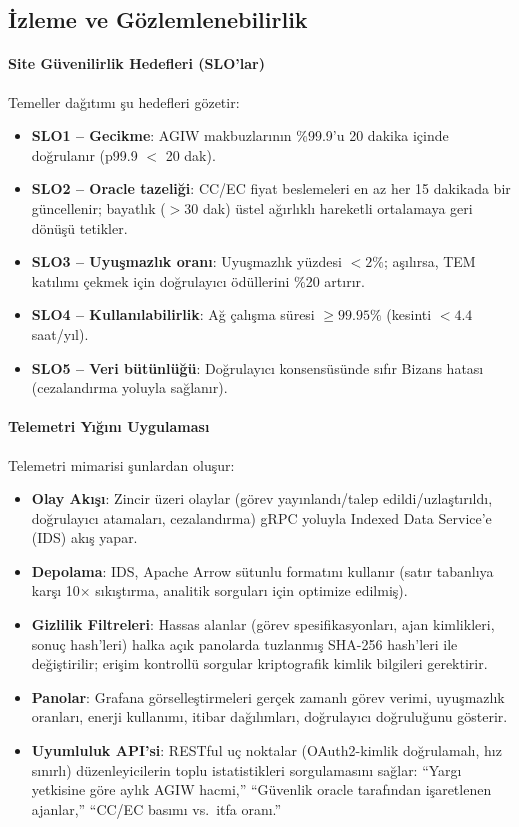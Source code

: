 \documentclass[11pt]{article}
\begin{document}
\subsection{İzleme ve Gözlemlenebilirlik}
\paragraph{Site Güvenilirlik Hedefleri (SLO'lar)} Temeller dağıtımı şu hedefleri gözetir:
\begin{itemize}[noitemsep]
  \item \textbf{SLO1 -- Gecikme}: AGIW makbuzlarının \%99.9'u 20 dakika içinde doğrulanır (p99.9 $<$ 20 dak).
  \item \textbf{SLO2 -- Oracle tazeliği}: CC/EC fiyat beslemeleri en az her 15 dakikada bir güncellenir; bayatlık ($>30$ dak) üstel ağırlıklı hareketli ortalamaya geri dönüşü tetikler.
  \item \textbf{SLO3 -- Uyuşmazlık oranı}: Uyuşmazlık yüzdesi $<2\%$; aşılırsa, TEM katılımı çekmek için doğrulayıcı ödüllerini \%20 artırır.
  \item \textbf{SLO4 -- Kullanılabilirlik}: Ağ çalışma süresi $\geq 99.95\%$ (kesinti $<4.4$ saat/yıl).
  \item \textbf{SLO5 -- Veri bütünlüğü}: Doğrulayıcı konsensüsünde sıfır Bizans hatası (cezalandırma yoluyla sağlanır).
\end{itemize}

\paragraph{Telemetri Yığını Uygulaması} Telemetri mimarisi şunlardan oluşur:
\begin{itemize}[noitemsep]
  \item \textbf{Olay Akışı}: Zincir üzeri olaylar (görev yayınlandı/talep edildi/uzlaştırıldı, doğrulayıcı atamaları, cezalandırma) gRPC yoluyla Indexed Data Service'e (IDS) akış yapar.
  \item \textbf{Depolama}: IDS, Apache Arrow sütunlu formatını kullanır (satır tabanlıya karşı 10$\times$ sıkıştırma, analitik sorguları için optimize edilmiş).
  \item \textbf{Gizlilik Filtreleri}: Hassas alanlar (görev spesifikasyonları, ajan kimlikleri, sonuç hash'leri) halka açık panolarda tuzlanmış SHA-256 hash'leri ile değiştirilir; erişim kontrollü sorgular kriptografik kimlik bilgileri gerektirir.
  \item \textbf{Panolar}: Grafana görselleştirmeleri gerçek zamanlı görev verimi, uyuşmazlık oranları, enerji kullanımı, itibar dağılımları, doğrulayıcı doğruluğunu gösterir.
  \item \textbf{Uyumluluk API'si}: RESTful uç noktalar (OAuth2-kimlik doğrulamalı, hız sınırlı) düzenleyicilerin toplu istatistikleri sorgulamasını sağlar: ``Yargı yetkisine göre aylık AGIW hacmi,'' ``Güvenlik oracle tarafından işaretlenen ajanlar,'' ``CC/EC basımı vs.\ itfa oranı.''
\end{itemize}
\end{document}

